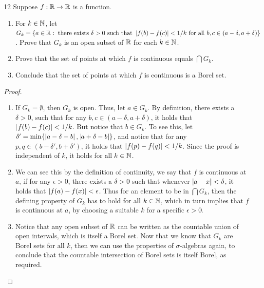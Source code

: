 \begin{exercise}{12}
Suppose $f : \mathbb{R} \to \mathbb{R}$ is a function.
\begin{enumerate}
    \item For $k \in \mathbb{N}$, let $G_k = \{a\in\mathbb{R} : \text{ there exists } \delta >0 \text{ such that } \left\lvert f(b)-f(c)\right\rvert<1/k \text{ for all } b,c\in(a-\delta,a+\delta)\}$.
    Prove that $G_k$ is an open subset of $\mathbb{R}$ for each $k\in\mathbb{N}$.
    \item Prove that the set of points at which $f$ is continuous equals $\bigcap G_k$.
    \item Conclude that the set of points at which $f$ is continuous is a Borel set.
\end{enumerate}
\end{exercise}
\begin{proof}
\begin{enumerate}
    \item If $G_k=\emptyset$, then $G_k$ is open.
    Thus, let $a \in G_k$.
    By definition, there exists a $\delta>0$, such that for any $b,c\in (a-\delta, a+\delta)$, it holds that $\left\lvert f(b)-f(c)\right\rvert < 1/k$. 
    But notice that $b \in G_k$.
    To see this, let $\delta' = \min\{\left\lvert a-\delta-b\right\rvert, \left\lvert a+\delta-b\right\rvert\}$, and notice that for any $p,q \in (b-\delta', b+\delta')$, it holds that $\left\lvert f(p)-f(q)\right\rvert < 1/k$.
    Since the proof is independent of $k$, it holds for all $k \in \mathbb{N}$.
    \item We can see this by the definition of continuity, we say that $f$ is continuous at $a$, if for any $\epsilon>0$, there exists a $\delta>0$ such that whenever $\left\lvert a-x\right\rvert<\delta$, it holds that $\left\lvert f(a)-f(x)\right\rvert<\epsilon$.
    Thus for an element to be in $\bigcap G_k$, then the defining property of $G_k$ has to hold for all $k\in\mathbb{N}$, which in turn implies that $f$ is continuous at $a$, by choosing a suitable $k$ for a specific $\epsilon>0$.
    \item Notice that any open subset of $\mathbb{R}$ can be written as the countable union of open intervals, which is itself a Borel set.
    Now that we know that $G_k$ are Borel sets for all $k$, then we can use the properties of $\sigma$-algebras again, to conclude that the countable intersection of Borel sets is itself Borel, as required.
\end{enumerate}
\end{proof} 


